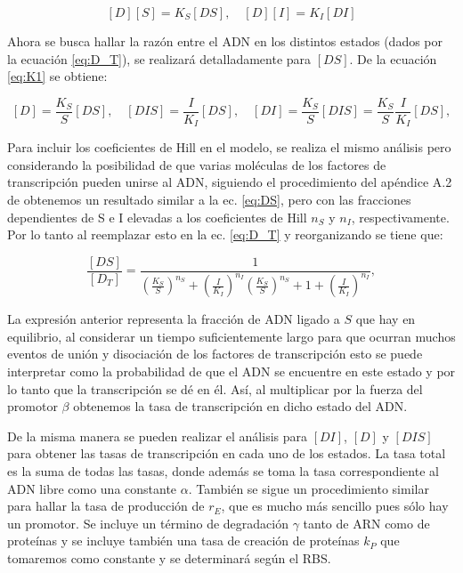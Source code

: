 \documentclass[12pt]{article}
\begin{document}
\begin{equation}
\label{eq:K1}
[D][S]=K_S[DS], \quad [D][I]=K_I[DI] 
\end{equation}

Ahora se busca hallar la raz\'on entre el ADN en los distintos estados (dados por la ecuaci\'on \ref{eq:D_T}), se realizar\'a detalladamente para $[DS]$. De la ecuaci\'on \ref{eq:K1} se obtiene:

\begin{equation}
\label{eq:DS}
[D] = \frac{K_S}{S}[DS], \quad [DIS] = \frac{I}{K_I}[DS], \quad [DI]=\frac{K_S}{S}[DIS]=\frac{K_S}{S}\frac{I}{K_I}[DS],
\end{equation}

Para incluir los coeficientes de Hill en el modelo, se realiza el mismo an\'alisis pero considerando la posibilidad de que varias mol\'eculas de los factores de transcripci\'on pueden unirse al ADN, siguiendo el procedimiento del ap\'endice A.2 de \cite{alon06} obtenemos un resultado similar a la ec. \ref{eq:DS}, pero con las fracciones dependientes de S e I elevadas a los coeficientes de Hill $n_S$ y $n_I$, respectivamente. Por lo tanto al reemplazar esto en la ec. \ref{eq:D_T} y reorganizando se tiene que:

\begin{equation}
\frac{[DS]}{[D_T]} = \frac{1}{\left( \frac{K_S}{S} \right)^{n_S} + \left( \frac{I}{K_I} \right)^{n_I} \left( \frac{K_S}{S} \right)^{n_S} + 1 + \left( \frac{I}{K_I} \right)^{n_I}},
\end{equation}

La expresi\'on anterior representa la fracci\'on de ADN ligado a $S$ que hay en equilibrio, al considerar un tiempo suficientemente largo para que ocurran muchos eventos de uni\'on y disociaci\'on de los factores de transcripci\'on esto se puede interpretar como la probabilidad de que el ADN se encuentre en este estado y por lo tanto que la transcripci\'on se d\'e en \'el. As\'i, al multiplicar por la fuerza del promotor $\beta$ obtenemos la tasa de transcripci\'on en dicho estado del ADN.

De la misma manera se pueden realizar el an\'alisis para $[DI]$, $[D]$ y $[DIS]$ para obtener las tasas de transcripci\'on en cada uno de los estados. La tasa total es la suma de todas las tasas, donde adem\'as se toma la tasa correspondiente al ADN libre como una constante  $\alpha$. Tambi\'en se sigue un procedimiento similar para hallar la tasa de producci\'on de $r_E$, que es mucho m\'as sencillo pues s\'olo hay un promotor. Se incluye un t\'ermino de degradaci\'on $\gamma$ tanto de ARN como de prote\'inas y se incluye tambi\'en una tasa de creaci\'on de prote\'inas $k_P$ que tomaremos como constante y se determinar\'a seg\'un el RBS.
\end{document}
